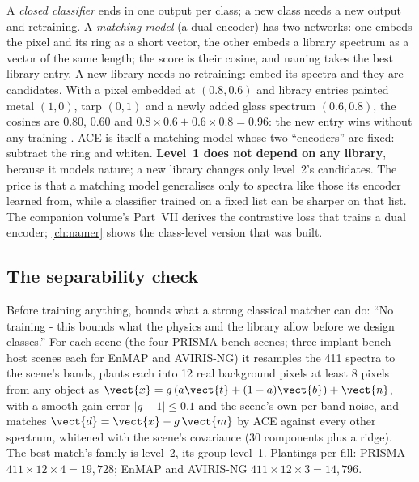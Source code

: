 A \emph{closed classifier} ends in one output per class; a new class needs a new output and retraining. A
\emph{matching model} (a dual encoder) has two networks: one embeds the pixel and its ring as a short vector, the
other embeds a library spectrum as a vector of the same length; the score is their cosine, and naming takes the
best library entry. A new library needs no retraining: embed its spectra and they are candidates. With a pixel
embedded at $(0.8,0.6)$ and library entries painted metal $(1,0)$, tarp $(0,1)$ and a newly added glass spectrum
$(0.6,0.8)$, the cosines are $0.80$, $0.60$ and $0.8\times0.6+0.6\times0.8=0.96$: the new entry wins without any
training \tagA. ACE is itself a matching model whose two ``encoders'' are fixed: subtract the ring and whiten.
\textbf{Level~1 does not depend on any library}, because it models nature; a new library changes only level~2's
candidates. The price is that a matching model generalises only to spectra like those its encoder learned from,
while a classifier trained on a fixed list can be sharper on that list. The companion volume's Part~VII derives the
contrastive loss that trains a dual encoder; \cref{ch:namer} shows the class-level version that was built.

\subsection{The separability check}\label{sec:material:separability}

Before training anything,  bounds what a strong classical matcher can do: ``No training - this
bounds what the physics and the library allow before we design classes.'' For each scene (the four PRISMA bench
scenes; three implant-bench host scenes each for EnMAP and AVIRIS-NG) it resamples the 411 spectra to the scene's
bands, plants each into 12 real background pixels at least 8 pixels from any object as
$\vect{x}=g\,(a\vect{t}+(1-a)\vect{b})+\vect{n}$, with a smooth gain error $|g-1|\le0.1$ and the scene's own per-band
noise, and matches $\vect{d}=\vect{x}-g\,\vect{m}$ by ACE against every other spectrum, whitened with the scene's
covariance (30 components plus a ridge). The best match's family is level~2, its group level~1. Plantings per fill:
PRISMA $411\times12\times4=19{,}728$; EnMAP and AVIRIS-NG $411\times12\times3=14{,}796$.

